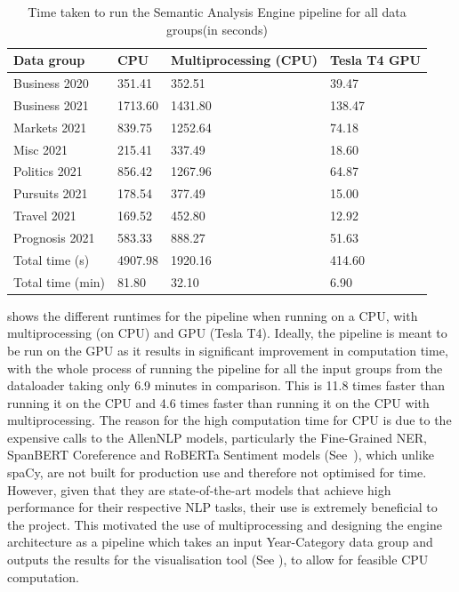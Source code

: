 \begin{table}[H] 
\centering
\renewcommand{\arraystretch}{1.05}
\begin{tabularx}{\textwidth}{X X X X} 
 \hline
Data group & CPU &  Multiprocessing (CPU) & Tesla T4 GPU \\
 \hline
 Business 2020  & 351.41  & 352.51  & 39.47 \\ 
 Business 2021  & 1713.60 & 1431.80 & 138.47 \\
 Markets 2021   & 839.75  & 1252.64 & 74.18\\
 Misc 2021      & 215.41  & 337.49  & 18.60 \\
 Politics 2021  & 856.42  & 1267.96 & 64.87 \\
 Pursuits 2021  & 178.54  & 377.49  & 15.00 \\ 
 Travel 2021    & 169.52  & 452.80  & 12.92 \\
 Prognosis 2021 & 583.33  & 888.27  & 51.63 \\ 
 \hline
 Total time (s) & 4907.98 & 1920.16 & 414.60 \\ 
 Total time (min) & 81.80  & 32.10 & 6.90\\ 
\end{tabularx}

\caption{Time taken to run the Semantic Analysis Engine pipeline for all data groups(in seconds)}
\label{table:cputime}
\end{table}
\vspace{-1em}
 shows the different runtimes for the pipeline when running on a CPU, with multiprocessing (on CPU) and GPU (Tesla T4). Ideally, the pipeline is meant to be run on the GPU as it results in significant improvement in computation time, with the whole process of running the pipeline for all the input groups from the dataloader taking only 6.9 minutes in comparison. This is 11.8 times faster than running it on the CPU and 4.6 times faster than running it on the CPU with multiprocessing. The reason for the high computation time for CPU is due to the expensive calls to the AllenNLP models, particularly the Fine-Grained NER, SpanBERT Coreference and RoBERTa Sentiment models (See~), which unlike spaCy, are not built for production use and therefore not optimised for time. However, given that they are state-of-the-art models that achieve high performance for their respective NLP tasks, their use is extremely beneficial to the project. This motivated the use of multiprocessing and designing the engine architecture as a pipeline which takes an input Year-Category data group and outputs the results for the visualisation tool (See ), to allow for feasible CPU computation. 

